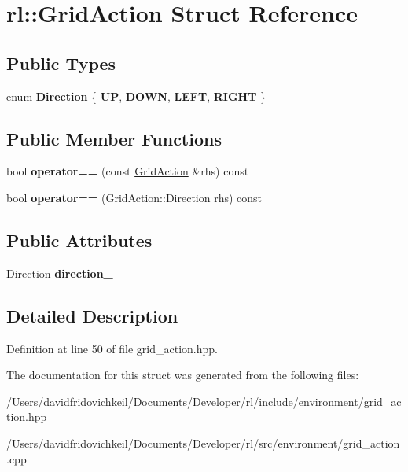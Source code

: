 \hypertarget{structrl_1_1_grid_action}{}\section{rl\+:\+:Grid\+Action Struct Reference}
\label{structrl_1_1_grid_action}
\subsection*{Public Types}
\begin{DoxyCompactItemize}
\item 
\hypertarget{structrl_1_1_grid_action_ab3b4b1b32a2a67afaf9c88bbe0527bb4}{}\label{structrl_1_1_grid_action_ab3b4b1b32a2a67afaf9c88bbe0527bb4} 
enum {\bfseries Direction} \{ {\bfseries UP}, 
{\bfseries D\+O\+WN}, 
{\bfseries L\+E\+FT}, 
{\bfseries R\+I\+G\+HT}
 \}
\end{DoxyCompactItemize}
\subsection*{Public Member Functions}
\begin{DoxyCompactItemize}
\item 
\hypertarget{structrl_1_1_grid_action_a993b14ba6d901d7174fe858ae558ef86}{}\label{structrl_1_1_grid_action_a993b14ba6d901d7174fe858ae558ef86} 
bool {\bfseries operator==} (const \hyperlink{structrl_1_1_grid_action}{Grid\+Action} \&rhs) const
\item 
\hypertarget{structrl_1_1_grid_action_a6ab02d4c6b0a70a83a8314429a33a176}{}\label{structrl_1_1_grid_action_a6ab02d4c6b0a70a83a8314429a33a176} 
bool {\bfseries operator==} (Grid\+Action\+::\+Direction rhs) const
\end{DoxyCompactItemize}
\subsection*{Public Attributes}
\begin{DoxyCompactItemize}
\item 
\hypertarget{structrl_1_1_grid_action_a064e3e1e58eef9d718cd0cadae0318b8}{}\label{structrl_1_1_grid_action_a064e3e1e58eef9d718cd0cadae0318b8} 
Direction {\bfseries direction\+\_\+}
\end{DoxyCompactItemize}


\subsection{Detailed Description}


Definition at line 50 of file grid\+\_\+action.\+hpp.



The documentation for this struct was generated from the following files\+:\begin{DoxyCompactItemize}
\item 
/\+Users/davidfridovichkeil/\+Documents/\+Developer/rl/include/environment/grid\+\_\+action.\+hpp\item 
/\+Users/davidfridovichkeil/\+Documents/\+Developer/rl/src/environment/grid\+\_\+action.\+cpp\end{DoxyCompactItemize}
